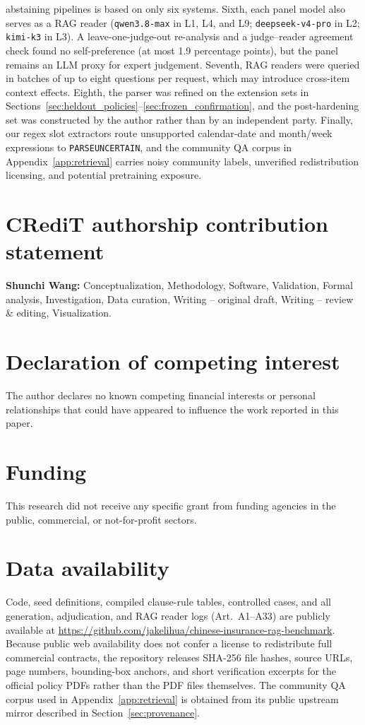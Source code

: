 \documentclass[10pt,twocolumn]{article}
\renewcommand{\_}{\textunderscore\allowbreak}
\begin{document}
abstaining pipelines is based on only six systems. Sixth, each panel model also serves as a RAG reader (\texttt{qwen3.8-max} in L1, L4, and L9; \texttt{deepseek-v4-pro} in L2; \texttt{kimi-k3} in L3). A leave-one-judge-out re-analysis and a judge--reader agreement check found no self-preference (at most 1.9 percentage points), but the panel remains an LLM proxy for expert judgement. Seventh, RAG readers were queried in batches of up to eight questions per request, which may introduce cross-item context effects. Eighth, the parser was refined on the extension sets in Sections~\ref{sec:heldout_policies}--\ref{sec:frozen_confirmation}, and the post-hardening set was constructed by the author rather than by an independent party. Finally, our regex slot extractors route unsupported calendar-date and month/week expressions to \texttt{PARSE\_UNCERTAIN}, and the community QA corpus in Appendix~\ref{app:retrieval} carries noisy community labels, unverified redistribution licensing, and potential pretraining exposure.

\section*{CRediT authorship contribution statement}
\textbf{Shunchi Wang:} Conceptualization, Methodology, Software, Validation, Formal analysis, Investigation, Data curation, Writing -- original draft, Writing -- review \& editing, Visualization.

\section*{Declaration of competing interest}
The author declares no known competing financial interests or personal relationships that could have appeared to influence the work reported in this paper.

\section*{Funding}
This research did not receive any specific grant from funding agencies in the public, commercial, or not-for-profit sectors.

\section*{Data availability}
Code, seed definitions, compiled clause-rule tables, controlled cases, and all generation, adjudication, and RAG reader logs (Art.~A1--A33) are publicly available at \url{https://github.com/jakelihua/chinese-insurance-rag-benchmark}. Because public web availability does not confer a license to redistribute full commercial contracts, the repository releases SHA-256 file hashes, source URLs, page numbers, bounding-box anchors, and short verification excerpts for the official policy PDFs rather than the PDF files themselves. The community QA corpus used in Appendix~\ref{app:retrieval} is obtained from its public upstream mirror described in Section~\ref{sec:provenance}.
\end{document}
